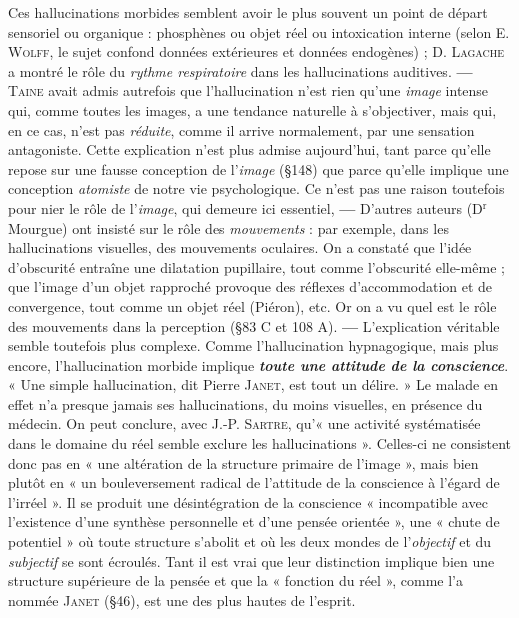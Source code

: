 Ces hallucinations morbides semblent avoir le plus souvent un
point de départ sensoriel ou organique : phosphènes ou objet réel
ou intoxication interne (selon E. \textsc{Wolff}, le sujet confond données
extérieures et données endogènes) ; D. \textsc{Lagache} a montré le
rôle du {\it rythme respiratoire} dans les hallucinations auditives. {\bf —}
\textsc{Taine} avait admis autrefois que l’hallucination n’est rien qu’une
{\it image} intense qui, comme toutes les images, a une tendance naturelle
à s’objectiver, mais qui, en ce cas, n’est pas {\it réduite}, comme il
arrive normalement, par une sensation antagoniste. Cette explication
n’est plus admise aujourd’hui, tant parce qu’elle repose sur une fausse
conception de l’{\it image} (\S 148) que parce qu’elle implique une conception
{\it atomiste} de notre vie psychologique. Ce n’est pas une raison toutefois
pour nier le rôle de l’{\it image}, qui demeure ici essentiel, {\bf —} D’autres
auteurs (D$^\text{r}$ Mourgue) ont insisté sur le rôle des {\it mouvements} : par
exemple, dans les hallucinations visuelles, des mouvements oculaires.
On a constaté que l’idée d’obscurité entraîne une dilatation pupillaire,
tout comme l’obscurité elle-même ; que l’image d’un objet rapproché
provoque des réflexes d’accommodation et de convergence,
tout comme un objet réel (Piéron), etc. Or on a vu quel est le rôle
des mouvements dans la perception (\S 83 C et 108 A). {\bf —} L'explication
véritable semble toutefois plus complexe. Comme l’hallucination
hypnagogique, mais plus encore, l’hallucination morbide implique
\textbf{\textit {toute une attitude de la conscience}}. « Une simple hallucination, dit
Pierre \textsc{Janet}, est tout un délire. » Le malade en effet n’a presque
jamais ses hallucinations, du moins visuelles, en présence du médecin.
On peut conclure, avec J.-P. \textsc{Sartre}, qu’« une activité systématisée
dans le domaine du réel semble exclure les hallucinations ». Celles-ci
ne consistent donc pas en « une altération de la structure primaire de
l’image », mais bien plutôt en « un bouleversement radical de l’attitude
de la conscience à l’égard de l’irréel ». Il se produit une désintégration
de la conscience « incompatible avec l’existence d'une synthèse
personnelle et d’une pensée orientée », une « chute de potentiel »
où toute structure s’abolit et où les deux mondes de l'{\it objectif} et
du {\it subjectif} se sont écroulés. Tant il est vrai que leur distinction
implique bien une structure supérieure de la pensée et que la « fonction
du réel », comme l’a nommée \textsc{Janet} (\S 46), est une des plus
hautes de l’esprit.


